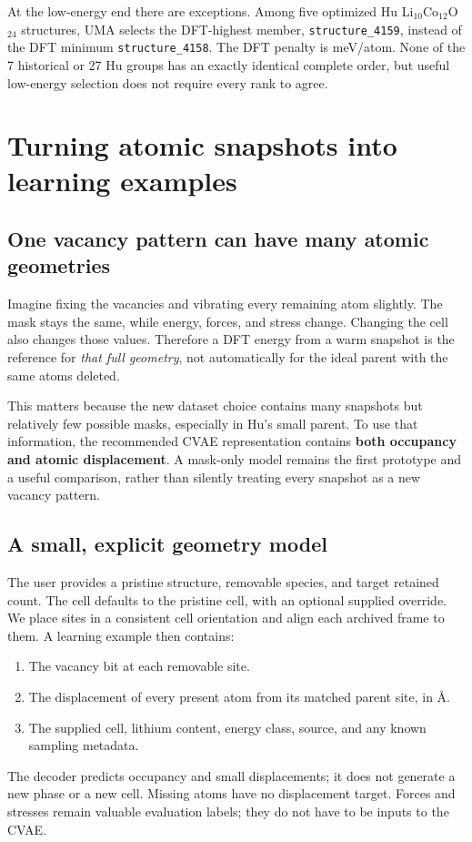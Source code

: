 At the low-energy end there are exceptions. Among five optimized Hu Li$_{10}$Co$_{12}$O$_{24}$ structures, UMA selects the DFT-highest member, \texttt{structure\_4159}, instead of the DFT minimum \texttt{structure\_4158}. The DFT penalty is \CounterRegret{} meV/atom. None of the 7 historical or 27 Hu groups has an exactly identical complete order, but useful low-energy selection does not require every rank to agree.


\clearpage
\section{Turning atomic snapshots into learning examples}\label{sec:representation}

\subsection*{One vacancy pattern can have many atomic geometries}
Imagine fixing the vacancies and vibrating every remaining atom slightly. The mask stays the same, while energy, forces, and stress change. Changing the cell also changes those values. Therefore a DFT energy from a warm snapshot is the reference for \emph{that full geometry}, not automatically for the ideal parent with the same atoms deleted.

This matters because the new dataset choice contains many snapshots but relatively few possible masks, especially in Hu's small parent. To use that information, the recommended CVAE representation contains \textbf{both occupancy and atomic displacement}. A mask-only model remains the first prototype and a useful comparison, rather than silently treating every snapshot as a new vacancy pattern.

\subsection*{A small, explicit geometry model}
The user provides a pristine structure, removable species, and target retained count. The cell defaults to the pristine cell, with an optional supplied override. We place sites in a consistent cell orientation and align each archived frame to them. A learning example then contains:
\begin{enumerate}
\item The vacancy bit at each removable site.
\item The displacement of every present atom from its matched parent site, in \AA.
\item The supplied cell, lithium content, energy class, source, and any known sampling metadata.
\end{enumerate}
The decoder predicts occupancy and small displacements; it does not generate a new phase or a new cell. Missing atoms have no displacement target. Forces and stresses remain valuable evaluation labels; they do not have to be inputs to the CVAE.

